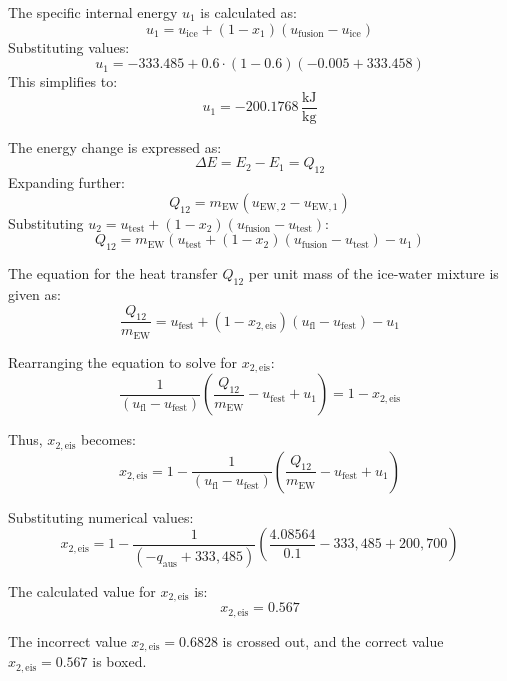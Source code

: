 The specific internal energy \( u_1 \) is calculated as:  
\[
u_1 = u_{\text{ice}} + (1 - x_1)(u_{\text{fusion}} - u_{\text{ice}})
\]  
Substituting values:  
\[
u_1 = -333.485 + 0.6 \cdot (1 - 0.6)(-0.005 + 333.458)
\]  
This simplifies to:  
\[
u_1 = -200.1768 \, \frac{\text{kJ}}{\text{kg}}
\]  

The energy change is expressed as:  
\[
\Delta E = E_2 - E_1 = Q_{12}
\]  
Expanding further:  
\[
Q_{12} = m_{\text{EW}} (u_{\text{EW},2} - u_{\text{EW},1})
\]  
Substituting \( u_2 = u_{\text{test}} + (1 - x_2)(u_{\text{fusion}} - u_{\text{test}}) \):  
\[
Q_{12} = m_{\text{EW}} \left( u_{\text{test}} + (1 - x_2)(u_{\text{fusion}} - u_{\text{test}}) - u_1 \right)
\]

The equation for the heat transfer \( Q_{12} \) per unit mass of the ice-water mixture is given as:  
\[
\frac{Q_{12}}{m_{\text{EW}}} = u_{\text{fest}} + (1 - x_{2,\text{eis}})(u_{\text{fl}} - u_{\text{fest}}) - u_1
\]

Rearranging the equation to solve for \( x_{2,\text{eis}} \):  
\[
\frac{1}{(u_{\text{fl}} - u_{\text{fest}})} \left( \frac{Q_{12}}{m_{\text{EW}}} - u_{\text{fest}} + u_1 \right) = 1 - x_{2,\text{eis}}
\]

Thus, \( x_{2,\text{eis}} \) becomes:  
\[
x_{2,\text{eis}} = 1 - \frac{1}{(u_{\text{fl}} - u_{\text{fest}})} \left( \frac{Q_{12}}{m_{\text{EW}}} - u_{\text{fest}} + u_1 \right)
\]

Substituting numerical values:  
\[
x_{2,\text{eis}} = 1 - \frac{1}{(-q_{\text{aus}} + 333,485)} \left( \frac{4.08564}{0.1} - 333,485 + 200,700 \right)
\]

The calculated value for \( x_{2,\text{eis}} \) is:  
\[
x_{2,\text{eis}} = 0.567
\]

The incorrect value \( x_{2,\text{eis}} = 0.6828 \) is crossed out, and the correct value \( x_{2,\text{eis}} = 0.567 \) is boxed.
